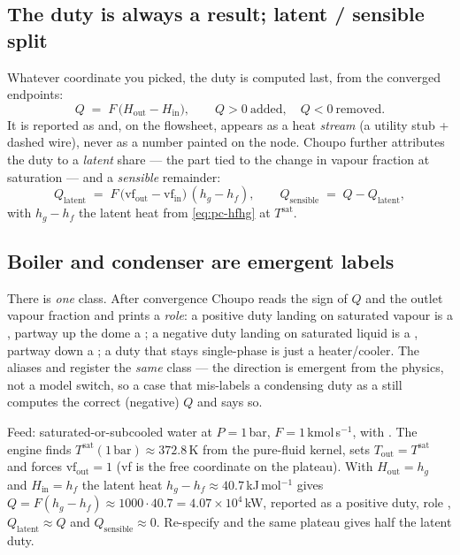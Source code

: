 \documentclass[11pt,a4paper]{article}
\begin{document}
\subsection{The duty is always a result; latent / sensible split}

Whatever coordinate you picked, the duty is computed last, from the converged
endpoints:
\begin{equation}
  Q \;=\; F\,\big(H_{\mathrm{out}} - H_{\mathrm{in}}\big),
  \qquad Q>0\ \text{added},\quad Q<0\ \text{removed}.
  \label{eq:pc-duty}
\end{equation}
It is reported as  and, on the flowsheet, appears as a heat
\emph{stream} (a utility stub + dashed wire), never as a number painted on the
node.  Choupo further attributes the duty to a \emph{latent} share --- the part
tied to the change in vapour fraction at saturation --- and a \emph{sensible}
remainder:
\begin{equation}
  Q_{\mathrm{latent}} \;=\; F\,\big(\mathrm{vf}_{\mathrm{out}} - \mathrm{vf}_{\mathrm{in}}\big)\,(h_g - h_f),
  \qquad
  Q_{\mathrm{sensible}} \;=\; Q - Q_{\mathrm{latent}},
  \label{eq:pc-latent}
\end{equation}
with $h_g - h_f$ the latent heat from \eqref{eq:pc-hfhg} at $T^{\mathrm{sat}}$.

\subsection{Boiler and condenser are emergent labels}

There is \emph{one} class.  After convergence Choupo reads the sign of $Q$ and
the outlet vapour fraction and prints a \emph{role}: a positive duty landing on
saturated vapour is a , partway up the dome a ;
a negative duty landing on saturated liquid is a , partway down a
; a duty that stays single-phase is just a heater/cooler.
The aliases  and  register the \emph{same} class ---
the direction is emergent from the physics, not a model switch, so a case that
mis-labels a condensing duty as a  still computes the correct
(negative) $Q$ and says so.

\begin{example}
Feed: saturated-or-subcooled water at $P=1\,$bar, $F=1\,$kmol\,s$^{-1}$, with
.  The engine finds
$T^{\mathrm{sat}}(1\,\text{bar})\approx 372.8\,$K from the pure-fluid kernel, sets
$T_{\mathrm{out}}=T^{\mathrm{sat}}$ and forces $\mathrm{vf}_{\mathrm{out}}=1$ (vf
is the free coordinate on the plateau).  With $H_{\mathrm{out}}=h_g$ and
$H_{\mathrm{in}}=h_f$ the latent heat $h_g-h_f\approx 40.7\,$kJ\,mol$^{-1}$ gives
$Q = F(h_g-h_f)\approx 1000\cdot 40.7 = 4.07\times10^{4}\,$kW, reported as a
positive duty, role , $Q_{\mathrm{latent}}\approx Q$ and
$Q_{\mathrm{sensible}}\approx 0$.  Re-specify  and the
same plateau gives half the latent duty.
\end{example}
\end{document}
